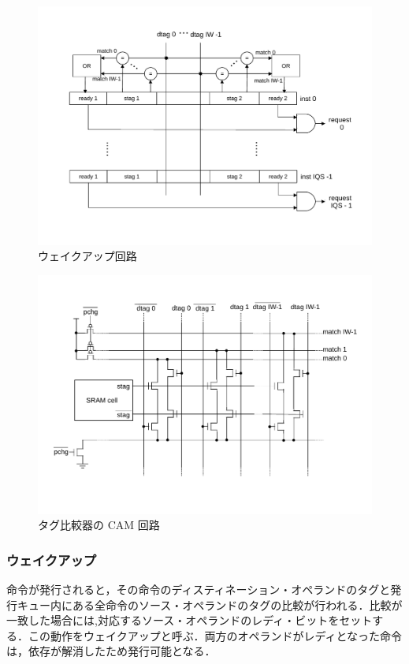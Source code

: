 \documentclass[submit,techrep,noauthor]{ipsj}
\begin{document}
\begin{figure}[tb]
  \centering
  \includegraphics[keepaspectratio, scale=.8]{wakeup_logic.pdf}
  \caption{ウェイクアップ回路}
  \label{fig:wakeup_logic}
\end{figure}

\begin{figure}[tb]
  \includegraphics[keepaspectratio, scale=.8]{cam.pdf}
  \caption{タグ比較器の CAM 回路}
  \label{fig:cam}
\end{figure}

\subsubsection{ウェイクアップ}
命令が発行されると，その命令のディスティネーション・オペランドのタグと発行キュー内にある全命令のソース・オペランドのタグの比較が行われる．比較が一致した場合には,対応するソース・オペランドのレディ・ビットをセットする．この動作をウェイクアップと呼ぶ．両方のオペランドがレディとなった命令は，依存が解消したため発行可能となる．
\end{document}
